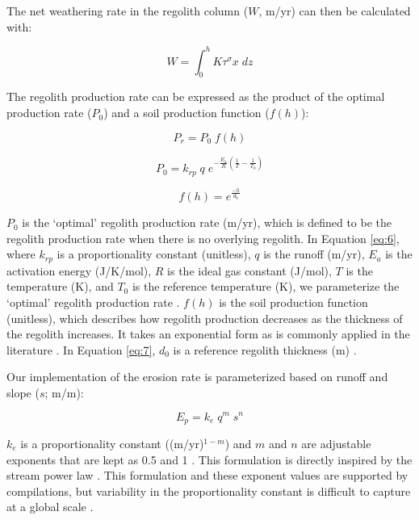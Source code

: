 \documentclass[9pt,twocolumn,twoside,lineno]{pnas-new}
\begin{document}
{The net weathering rate in the regolith column ($W$, m/yr) can then be calculated with:

\begin{equation}
    W = \int_{0}^{h} K \tau^{\sigma} x\;dz
    \label{eq:4}
\end{equation}

The regolith production rate can be expressed as the product of the optimal production rate ($P_{0}$) and a soil production function ($f(h)$):

\begin{equation}
    P_{r} = P_{0}\;f(h)
    \label{eq:5}
\end{equation}

\begin{equation}
    P_{0} = k_{rp}\;q\;e^{-\frac{E_{a}}{R}\left(\frac{1}{T}-\frac{1}{T_{0}}\right)}
    \label{eq:6}
\end{equation}

\begin{equation}
    f(h) = e^{\frac{-h}{d_{0}}}
    \label{eq:7}
\end{equation}

\noindent
$P_{0}$ is the `optimal' regolith production rate (m/yr), which is defined to be the regolith production rate when there is no overlying regolith. In Equation \ref{eq:6}, where $k_{rp}$ is a proportionality constant (unitless), $q$ is the runoff (m/yr), $E_{a}$ is the activation energy (J/K/mol), $R$ is the ideal gas constant (J/mol), $T$ is the temperature (K), and $T_{0}$ is the reference temperature (K), we parameterize the `optimal' regolith production rate \cite{Carretier2014a}. $f(h)$ is the soil production function (unitless), which describes how regolith production decreases as the thickness of the regolith increases. It takes an exponential form as is commonly applied in the literature \cite{Gabet2009a}. In Equation \ref{eq:7}, $d_{0}$ is a reference regolith thickness (m) \cite{Heimsath1997a}.

Our implementation of the erosion rate is parameterized based on runoff and slope ($s$; m/m):

\begin{equation}
    E_{p} = k_{e}\;q^{m}\;s^{n}
    \label{eq:8}
\end{equation}

\noindent
$k_{e}$ is a proportionality constant ((m/yr)$^{1-m}$) and $m$ and $n$ are adjustable exponents that are kept as 0.5 and 1 \cite{Maffre2018a}. This formulation is directly inspired by the stream power law \cite{Davy2000a}. This formulation and these exponent values are supported by compilations, but variability in the proportionality constant is difficult to capture at a global scale \cite{Lague2013a}.

}
\end{document}
